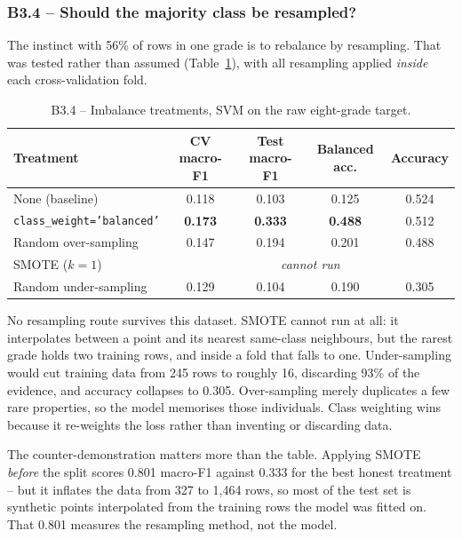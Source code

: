 \documentclass[11pt,a4paper]{article}
\begin{document}
\subsubsection*{B3.4 -- Should the majority class be resampled?}

The instinct with 56\% of rows in one grade is to rebalance by resampling. That was tested
rather than assumed (Table~\ref{tab:resample}), with all resampling applied \emph{inside} each
cross-validation fold.

\begin{table}[H]
\centering
\small
\caption{B3.4 -- Imbalance treatments, SVM on the raw eight-grade target.}
\label{tab:resample}
\begin{tabular}{lcccc}
\toprule
\textbf{Treatment} & \textbf{CV macro-F1} & \textbf{Test macro-F1} & \textbf{Balanced acc.} & \textbf{Accuracy} \\
\midrule
None (baseline)             & 0.118 & 0.103 & 0.125 & 0.524 \\
\texttt{class\_weight='balanced'} & \textbf{0.173} & \textbf{0.333} & \textbf{0.488} & 0.512 \\
Random over-sampling        & 0.147 & 0.194 & 0.201 & 0.488 \\
SMOTE ($k=1$)               & \multicolumn{4}{c}{\emph{cannot run}} \\
Random under-sampling       & 0.129 & 0.104 & 0.190 & 0.305 \\
\bottomrule
\end{tabular}
\end{table}

No resampling route survives this dataset. SMOTE cannot run at all: it interpolates between a
point and its nearest same-class neighbours, but the rarest grade holds two training rows, and
inside a fold that falls to one. Under-sampling would cut training data from 245 rows to roughly
16, discarding 93\% of the evidence, and accuracy collapses to 0.305. Over-sampling merely
duplicates a few rare properties, so the model memorises those individuals. Class weighting wins
because it re-weights the loss rather than inventing or discarding data.

The counter-demonstration matters more than the table. Applying SMOTE \emph{before} the split
scores 0.801 macro-F1 against 0.333 for the best honest treatment -- but it inflates the data
from 327 to 1{,}464 rows, so most of the test set is synthetic points interpolated from the
training rows the model was fitted on. That 0.801 measures the resampling method, not the
model.
\end{document}
